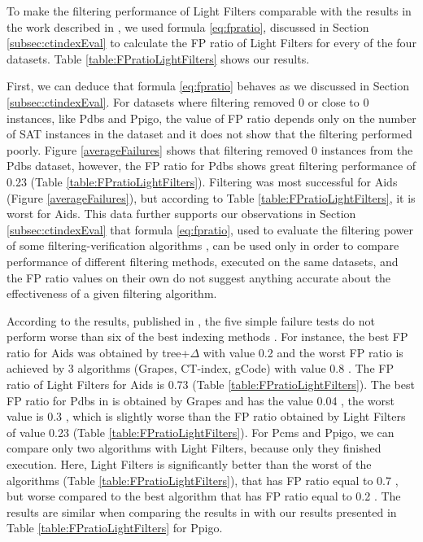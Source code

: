 \documentclass{l4proj}
\begin{document}
To make the filtering performance of Light Filters comparable with the results in the work described in \cite{foteini}, we used formula \ref{eq:fpratio}, discussed in Section \ref{subsec:ctindexEval} to calculate the FP ratio of Light Filters for every of the four datasets. Table \ref{table:FPratioLightFilters} shows our results.

First, we can deduce that formula \ref{eq:fpratio} behaves as we discussed in Section \ref{subsec:ctindexEval}. For datasets where filtering removed 0 or close to 0 instances, like Pdbs and Ppigo, the value of FP ratio depends only on the number of SAT instances in the dataset and it does not show that the filtering performed poorly. Figure \ref{averageFailures} shows that filtering removed 0 instances from the Pdbs dataset, however, the FP ratio for Pdbs shows great filtering performance of 0.23 (Table \ref{table:FPratioLightFilters}). Filtering was most successful for Aids (Figure \ref{averageFailures}), but according to Table \ref{table:FPratioLightFilters}, it is worst for Aids. This data further supports our observations in Section \ref{subsec:ctindexEval} that formula \ref{eq:fpratio}, used to evaluate the filtering power of some filtering-verification algorithms \cite{foteini}, can be used only in order to compare performance of different filtering methods, executed on the same datasets, and the FP ratio values on their own do not suggest anything accurate about the effectiveness of a given filtering algorithm. 

According to the results, published in \cite{foteini}, the five simple failure tests do not perform worse than six of the best indexing methods \cite{foteini}. For instance, the best FP ratio for Aids was obtained by tree+$\Delta$ with value 0.2 \cite{foteini} and the worst FP ratio is achieved by 3 algorithms (Grapes, CT-index, gCode) with value 0.8 \cite{foteini}. The FP ratio of Light Filters for Aids is 0.73 (Table \ref{table:FPratioLightFilters}). The best FP ratio for Pdbs in \cite{foteini} is obtained by Grapes and has the value 0.04 \cite{foteini}, the worst value is 0.3 \cite{foteini}, which is slightly worse than the FP ratio obtained by Light Filters of value 0.23 (Table \ref{table:FPratioLightFilters}). For Pcms and Ppigo, we can compare only two algorithms with Light Filters, because only they finished execution. Here, Light Filters is significantly better than the worst of the algorithms (Table \ref{table:FPratioLightFilters}), that has FP ratio equal to 0.7 \cite{foteini}, but worse compared to the best algorithm that has FP ratio equal to 0.2 \cite{foteini}. The results are similar when comparing the results in \cite{foteini} with our results presented in Table \ref{table:FPratioLightFilters} for Ppigo.
\end{document}
